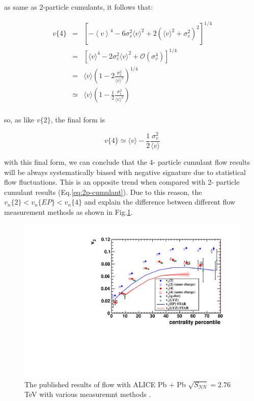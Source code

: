 as same as 2-particle cumulants, it follows that:

\begin{eqnarray}
	v\{4\} &=& \left[ -\left\langle v \right\rangle^4 - 6 \sigma_v^2 \langle v \rangle^2 + 2\left( \langle v \rangle^2 + \sigma_v^2 \right)^2 \right]^{1/4} \\
	&=& \left[ \langle v \rangle^4 - 2 \sigma_v^2 \langle v \rangle ^2 + \mathcal{O}(\sigma_v^4) \right]^{1/4} \\
	&=& \langle v \rangle \left(1 - 2 \frac{\sigma_v^2}{\langle v \rangle^2} \right) ^{1/4} \\
	&\simeq & \langle v \rangle \left( 1 - \frac{1}{2} \frac{\sigma_v^2}{\langle v \rangle^2} \right)	\\
\end{eqnarray}

so, as like $v\{2\}$, the final form is

\begin{equation}
	v\{4\} \simeq \langle v \rangle - \frac{1}{2} \frac{\sigma_v^2}{\langle v \rangle} 
\end{equation}
\smallskip

with this final form, we can conclude that the 4- particle cumulant flow results will be always systematically biased with negative signature due to statistical flow fluctuations. This is an opposite trend when compared with 2- particle cumulant results (Eq.\ref{eq:2p-cumulant}). Due to this reason, the $v_n\{2\} < v_n\{EP\} < v_n\{4\}$ and explain the difference between different flow measurement methods as shown in Fig.\ref{fig:alice_flow_result}.



\begin{figure}[!h]
\centerline{\includegraphics[width=12.0cm]{figures/alice_flow_result}}
\caption{ The published results of flow with ALICE Pb + Pb $\sqrt{S_{NN}}=2.76$TeV with various measuremnt methods \cite{Aamodt:2010pa}.} 
\label{fig:alice_flow_result}
\end{figure}


